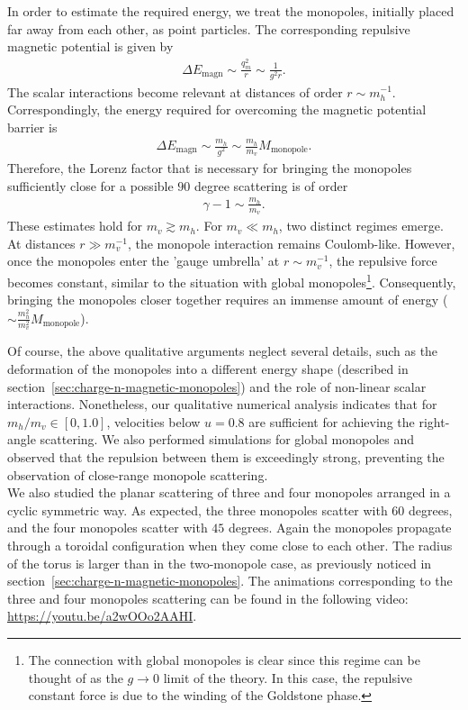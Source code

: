 \documentclass[aps, prd, twocolumn, superscriptaddress, preprintnumbers, nofootinbib, longbibliography]{revtex4-1}
\begin{document}
 In order to estimate the required energy, we treat the monopoles, initially placed far away from each other, as point particles.  
 The corresponding repulsive magnetic potential is given by
\begin{align*}
    \Delta E_\text{magn}\sim\frac{q_m^2}{r}\sim \frac{1}{g^2 r}.
\end{align*}
The scalar interactions become relevant at distances of 
order $r \sim m_h^{-1}$.    Correspondingly,  the energy required for overcoming  the magnetic potential barrier is 
\begin{align*}
    \Delta E_\text{magn}\sim \frac{m_h}{g^2} \sim \frac{m_h}{m_v} M_\text{monopole}.
\end{align*}
Therefore, the Lorenz factor that is necessary for  bringing the monopoles sufficiently close for a possible $90$ degree scattering is of order
\begin{align}
    \gamma-1 \sim \frac{m_h}{m_v}.
\end{align}
These estimates hold for $m_v \gtrsim m_h$. For $m_v \ll m_h$, two distinct regimes emerge. At distances $r \gg m_v^{-1}$, the monopole interaction remains Coulomb-like. However, once the monopoles enter the 'gauge umbrella' at $r \sim m_v^{-1}$, the repulsive force becomes constant, similar to the situation with global monopoles\footnote{The connection with global monopoles is clear 
since this regime can be thought of as the $g \rightarrow 0$ limit of the theory. In this case, the repulsive constant force is due to the winding of the Goldstone phase.}. 
Consequently, bringing the monopoles closer together requires an immense amount of energy ($\sim \frac{m_h^2}{m_v^2} M_\text{monopole}$).

 Of course, the above qualitative arguments neglect several details, such as the deformation of the monopoles into a different energy shape (described in section~\ref{sec:charge-n-magnetic-monopoles}) and the role of non-linear scalar interactions. Nonetheless, our qualitative numerical analysis indicates that for $m_h/m_v\in [0, 1.0]$, velocities below $u=0.8$ are sufficient for achieving the right-angle scattering. We also performed simulations for global monopoles and observed that the repulsion between them is exceedingly strong, preventing the observation of close-range monopole scattering.\\

We also studied the planar scattering of three and four monopoles arranged in a cyclic symmetric way. As expected, the three monopoles scatter with $60$ degrees, and the four monopoles scatter with $45$ degrees. Again the monopoles propagate through a toroidal configuration when they come close to each other. The radius of the torus is larger than in the two-monopole case, as previously noticed in section~\ref{sec:charge-n-magnetic-monopoles}. The animations corresponding to the three and four monopoles scattering can be found in the following video:\\
\url{https://youtu.be/a2wOOo2AAHI}.
\end{document}
